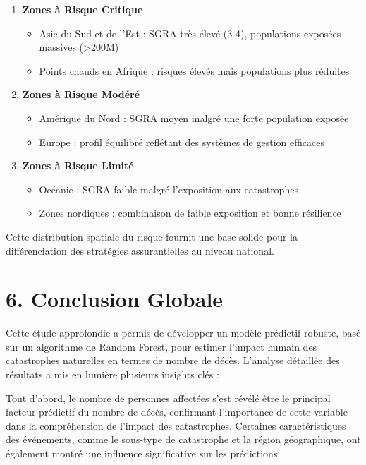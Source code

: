 \documentclass[
]{article}
\providecommand{\tightlist}{%
  \setlength{\itemsep}{0pt}\setlength{\parskip}{0pt}}
\begin{document}
\begin{enumerate}
\def\labelenumi{\arabic{enumi}.}
\tightlist
\item
  \textbf{Zones à Risque Critique}

  \begin{itemize}
  \tightlist
  \item
    Asie du Sud et de l'Est : SGRA très élevé (3-4), populations
    exposées massives (\textgreater200M)
  \item
    Points chauds en Afrique : risques élevés mais populations plus
    réduites
  \end{itemize}
\item
  \textbf{Zones à Risque Modéré}

  \begin{itemize}
  \tightlist
  \item
    Amérique du Nord : SGRA moyen malgré une forte population exposée
  \item
    Europe : profil équilibré reflétant des systèmes de gestion
    efficaces
  \end{itemize}
\item
  \textbf{Zones à Risque Limité}

  \begin{itemize}
  \tightlist
  \item
    Océanie : SGRA faible malgré l'exposition aux catastrophes
  \item
    Zones nordiques : combinaison de faible exposition et bonne
    résilience
  \end{itemize}
\end{enumerate}

Cette distribution spatiale du risque fournit une base solide pour la
différenciation des stratégies assurantielles au niveau national.

\section{6. Conclusion Globale}\label{conclusion-globale}

Cette étude approfondie a permis de développer un modèle prédictif
robuste, basé sur un algorithme de Random Forest, pour estimer l'impact
humain des catastrophes naturelles en termes de nombre de décès.
L'analyse détaillée des résultats a mis en lumière plusieurs insights
clés :

Tout d'abord, le nombre de personnes affectées s'est révélé être le
principal facteur prédictif du nombre de décès, confirmant l'importance
de cette variable dans la compréhension de l'impact des catastrophes.
Certaines caractéristiques des événements, comme le sous-type de
catastrophe et la région géographique, ont également montré une
influence significative sur les prédictions.
\end{document}
